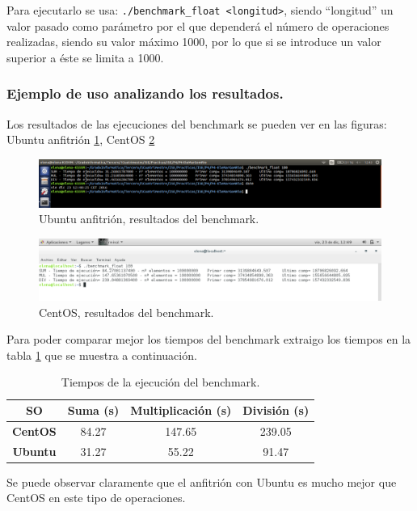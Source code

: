 Para ejecutarlo se usa: \texttt{./benchmark\_float <longitud>}, siendo ``longitud'' un valor pasado como parámetro por el que dependerá el número de operaciones realizadas, siendo su valor máximo 1000, por lo que si se introduce un valor superior a éste se limita a 1000.


\subsubsection{Ejemplo de uso analizando los resultados.}

Los resultados de las ejecuciones del benchmark se pueden ver en las figuras: Ubuntu anfitrión \ref{fig:ejercicio5_1}, CentOS \ref{fig:ejercicio5_2} 

\begin{figure}[H] 
	\centering
	\includegraphics[width=14.7cm]{./img/ejercicio5_1.png} 	
	\caption{Ubuntu anfitrión, resultados del benchmark.} \label{fig:ejercicio5_1}
\end{figure}

\begin{figure}[H] 
	\centering
	\includegraphics[width=14.7cm]{./img/ejercicio5_2.png} 	
	\caption{CentOS, resultados del benchmark.} \label{fig:ejercicio5_2}
\end{figure}


Para poder comparar mejor los tiempos del benchmark extraigo los tiempos en la tabla \ref{comparativa_bench} que se muestra a continuación.

\begin{table}[H]
\centering
\small
\setlength\tabcolsep{2pt}
\caption{Tiempos de la ejecución del benchmark.}
\label{comparativa_bench}
\begin{tabular}{|c|c|c|c|}
\hline
\textbf{SO}      & \textbf{Suma (s)} & \textbf{Multiplicación (s)} & \textbf{División (s)}  \\ \hline
\textbf{CentOS}  & 84.27          & 147.65             & 239.05 \\ \hline
\textbf{Ubuntu}  & 31.27         & 55.22          & 91.47                  \\ \hline
\end{tabular}
\end{table}

Se puede observar claramente que el anfitrión con Ubuntu es mucho mejor que CentOS en este tipo de operaciones.





